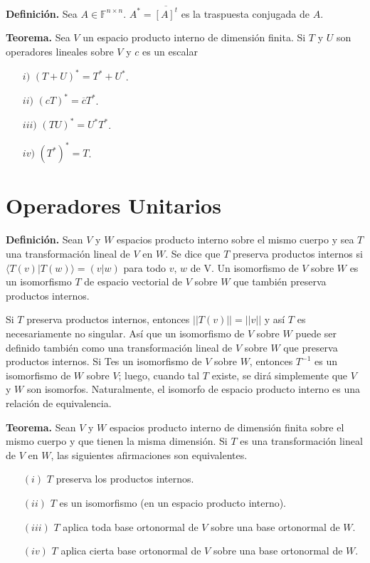 \newpage



\textbf{Definición.} Sea $A \in \mathbb{F}^{n\times n}$. $A^{\ast}
=\overline{[A]^{t}}$ es la traspuesta conjugada de $A$.

\textbf{Teorema.} Sea $V$ un espacio producto interno de dimensión
finita. Si $T$ y $U$ son operadores lineales sobre $V$ y $c$ es un
escalar
\begin{itemize}
    \item[$i)$] $(T + U)^{\ast}= T^{\ast} + U^{\ast}$.
    \item[$ii)$] $(cT)^{\ast} = \overline{c}T^{\ast}$.
    \item[$iii)$] $(TU)^{\ast} = U^{\ast}T^{\ast}$.
    \item[$iv)$] $(T^{\ast})^{\ast} = T$.
\end{itemize}

\section{Operadores Unitarios}

\textbf{Definición.} Sean $V$ y $W$ espacios producto interno sobre
el mismo cuerpo y sea $T$ una transformación lineal de $V$ en $W$.
Se dice que $T$ preserva productos internos si $\langle T(v)|T(w)
\rangle = (v|w)$ para todo $v$, $w$ de V. Un isomorﬁsmo de $V$
sobre $W$ es un isomorfismo $T$ de espacio vectorial de $V$ sobre
$W$ que también preserva productos internos.

Si $T$ preserva productos internos, entonces $||T(v)||=||v||$ y así $T$
es necesariamente no singular.
Así que un isomorfismo de $V$ sobre $W$ puede ser definido
también como una transformación lineal de $V$ sobre $W$ que preserva
productos internos. Si Tes un isomorfismo de $V$ sobre $W$, entonces
$T^{-1}$ es un isomorfismo de $W$ sobre $V$; luego, cuando tal $T$
existe, se dirá simplemente que $V$ y $W$ son isomorfos.
Naturalmente, el isomorfo de espacio producto interno es una relación
de equivalencia.

\textbf{Teorema.} Sean $V$ y $W$ espacios producto interno de
dimensión finita sobre el mismo cuerpo y que tienen la misma
dimensión. Si $T$ es una transformación lineal de $V$ en $W$,
las siguientes afirmaciones son equivalentes.
\begin{itemize}
	\item[$(i)$] $T$ preserva los productos internos.
	\item[$(ii)$] $T$ es un isomorfismo (en un espacio
	producto interno).
	\item[$(iii)$] $T$ aplica toda base ortonormal de $V$
	sobre una base ortonormal de $W$.
	\item[$(iv)$] $T$ aplica cierta base ortonormal de $V$
	sobre una base ortonormal de $W$.
\end{itemize}